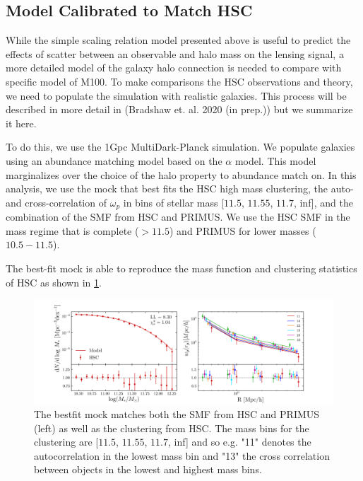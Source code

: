 \documentclass[a4paper,fleqn,usenatbib]{mnras}
\begin{document}
       
       
       
\subsection{Model Calibrated to Match HSC}

While the simple scaling relation model presented above is useful to predict the effects of scatter between an observable and halo mass on the lensing signal, a more detailed model of the galaxy halo connection is needed to compare with specific model of M100. To make comparisons the HSC observations and theory, we need to populate the simulation with realistic galaxies. This process will be described in more detail in (Bradshaw et. al. 2020 (in prep.)) but we summarize it here.

To do this, we use the 1Gpc MultiDark-Planck simulation. We populate galaxies using an abundance matching model based on the \citet{Lehmann2017} $\alpha$ model. This model marginalizes over the choice of the halo property to abundance match on. In this analysis, we use the mock that best fits the HSC high mass clustering, the auto- and cross-correlation of $\omega_p$ in bins of stellar mass [$11.5$, $11.55$, $11.7$, inf], and the combination of the SMF from HSC and PRIMUS. We use the HSC SMF in the mass regime that is complete ($> 11.5$) and PRIMUS for lower masses ($10.5 - 11.5$).

The best-fit mock is able to reproduce the mass function and clustering statistics of HSC as shown in \ref{fig:best_mock}.

\begin{figure}
  \centering
  \includegraphics[width=\textwidth]{fig/mdpl_vmaxAtMpeak_mpeak_alpha_ext.png}
  \caption{The bestfit mock matches both the SMF from HSC and PRIMUS (left) as well as the clustering from HSC. The mass bins for the clustering are [$11.5$, $11.55$, $11.7$, inf] and so e.g. "11" denotes the autocorrelation in the lowest mass bin and "13" the cross correlation between objects in the lowest and highest mass bins.}
  \label{fig:best_mock}
\end{figure}
\end{document}
